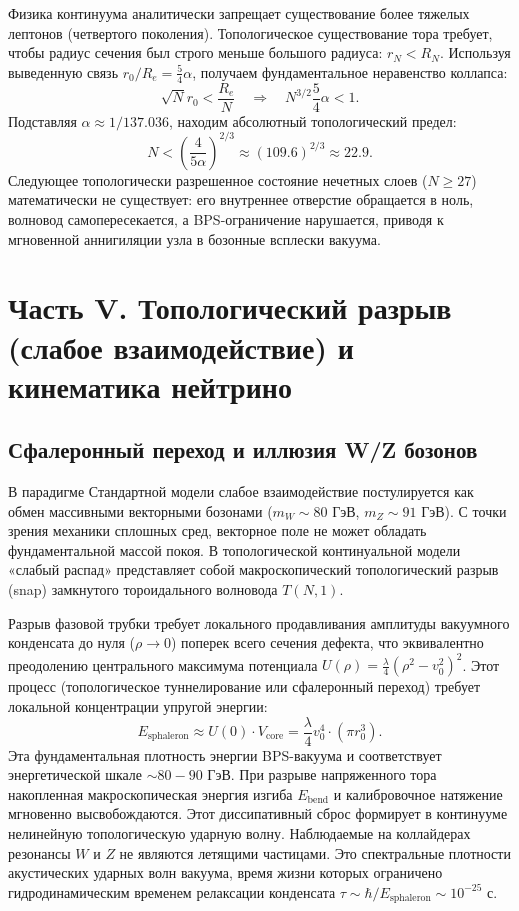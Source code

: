 \documentclass[12pt,a4paper]{article}
\begin{document}
Физика континуума аналитически запрещает существование более тяжелых лептонов (четвертого поколения). Топологическое существование тора требует, чтобы радиус сечения был строго меньше большого радиуса: $r_N < R_N$. Используя выведенную связь $r_0/R_e = \frac{5}{4}\alpha$, получаем фундаментальное неравенство коллапса:
\begin{equation}
	\sqrt{N} r_0 < \frac{R_e}{N} \quad \Longrightarrow \quad N^{3/2} \frac{5}{4}\alpha < 1.
\end{equation}
Подставляя $\alpha \approx 1/137.036$, находим абсолютный топологический предел:
\begin{equation}
	N < \left( \frac{4}{5\alpha} \right)^{2/3} \approx (109.6)^{2/3} \approx 22.9.
\end{equation}
Следующее топологически разрешенное состояние нечетных слоев ($N \ge 27$) математически не существует: его внутреннее отверстие обращается в ноль, волновод самопересекается, а BPS-ограничение нарушается, приводя к мгновенной аннигиляции узла в бозонные всплески вакуума.

\section{Часть V. Топологический разрыв (слабое взаимодействие) и кинематика нейтрино}

\subsection{Сфалеронный переход и иллюзия W/Z бозонов}
В парадигме Стандартной модели слабое взаимодействие постулируется как обмен массивными векторными бозонами ($m_W \sim 80$ ГэВ, $m_Z \sim 91$ ГэВ). С точки зрения механики сплошных сред, векторное поле не может обладать фундаментальной массой покоя. В топологической континуальной модели «слабый распад» представляет собой макроскопический топологический разрыв (snap) замкнутого тороидального волновода $T(N,1)$.

Разрыв фазовой трубки требует локального продавливания амплитуды вакуумного конденсата до нуля ($\rho \to 0$) поперек всего сечения дефекта, что эквивалентно преодолению центрального максимума потенциала $U(\rho) = \frac{\lambda}{4}(\rho^2 - v_0^2)^2$. Этот процесс (топологическое туннелирование или сфалеронный переход) требует локальной концентрации упругой энергии:
\begin{equation}
	E_{\text{sphaleron}} \approx U(0) \cdot V_{\text{core}} = \frac{\lambda}{4} v_0^4 \cdot (\pi r_0^3).
\end{equation}
Эта фундаментальная плотность энергии BPS-вакуума и соответствует энергетической шкале $\sim 80-90$ ГэВ. При разрыве напряженного тора накопленная макроскопическая энергия изгиба $E_{\text{bend}}$ и калибровочное натяжение мгновенно высвобождаются. Этот диссипативный сброс формирует в континууме нелинейную топологическую ударную волну. 
Наблюдаемые на коллайдерах резонансы $W$ и $Z$ не являются летящими частицами. Это спектральные плотности акустических ударных волн вакуума, время жизни которых ограничено гидродинамическим временем релаксации конденсата $\tau \sim \hbar / E_{\text{sphaleron}} \sim 10^{-25}$ с. 
\end{document}
